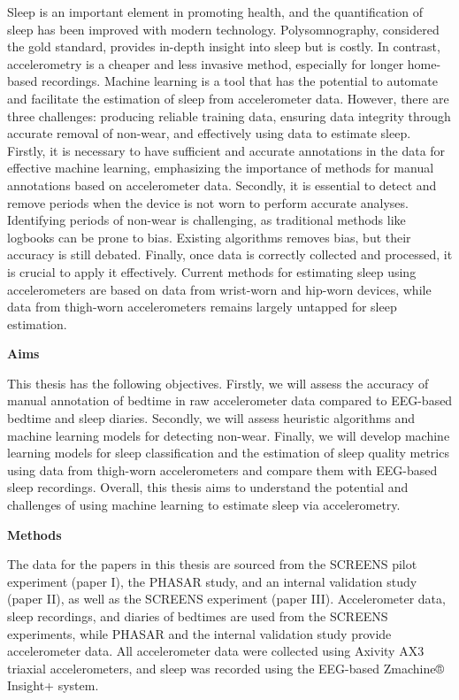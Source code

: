 \documentclass[
  9pt,
]{scrbook}
\begin{document}
Sleep is an important element in promoting health, and the
quantification of sleep has been improved with modern technology.
Polysomnography, considered the gold standard, provides in-depth insight
into sleep but is costly. In contrast, accelerometry is a cheaper and
less invasive method, especially for longer home-based recordings.
Machine learning is a tool that has the potential to automate and
facilitate the estimation of sleep from accelerometer data. However,
there are three challenges: producing reliable training data, ensuring
data integrity through accurate removal of non-wear, and effectively
using data to estimate sleep. Firstly, it is necessary to have
sufficient and accurate annotations in the data for effective machine
learning, emphasizing the importance of methods for manual annotations
based on accelerometer data. Secondly, it is essential to detect and
remove periods when the device is not worn to perform accurate analyses.
Identifying periods of non-wear is challenging, as traditional methods
like logbooks can be prone to bias. Existing algorithms removes bias,
but their accuracy is still debated. Finally, once data is correctly
collected and processed, it is crucial to apply it effectively. Current
methods for estimating sleep using accelerometers are based on data from
wrist-worn and hip-worn devices, while data from thigh-worn
accelerometers remains largely untapped for sleep estimation.

\textbf{Aims}

This thesis has the following objectives. Firstly, we will assess the
accuracy of manual annotation of bedtime in raw accelerometer data
compared to EEG-based bedtime and sleep diaries. Secondly, we will
assess heuristic algorithms and machine learning models for detecting
non-wear. Finally, we will develop machine learning models for sleep
classification and the estimation of sleep quality metrics using data
from thigh-worn accelerometers and compare them with EEG-based sleep
recordings. Overall, this thesis aims to understand the potential and
challenges of using machine learning to estimate sleep via
accelerometry.

\textbf{Methods}

The data for the papers in this thesis are sourced from the SCREENS
pilot experiment (paper I), the PHASAR study, and an internal validation
study (paper II), as well as the SCREENS experiment (paper III).
Accelerometer data, sleep recordings, and diaries of bedtimes are used
from the SCREENS experiments, while PHASAR and the internal validation
study provide accelerometer data. All accelerometer data were collected
using Axivity AX3 triaxial accelerometers, and sleep was recorded using
the EEG-based Zmachine® Insight+ system.
\end{document}
